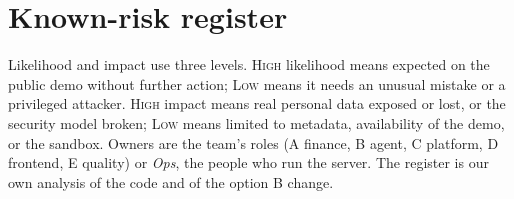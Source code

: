 \documentclass[11pt,a4paper]{article}
\newcommand{\lvl}[1]{\textsc{#1}}
\begin{document}
\section{Known-risk register}\label{sec:register}

Likelihood and impact use three levels. \lvl{High} likelihood means expected on the public demo without further action;
\lvl{Low} means it needs an unusual mistake or a privileged attacker. \lvl{High} impact means real personal data exposed
or lost, or the security model broken; \lvl{Low} means limited to metadata, availability of the demo, or the sandbox.
Owners are the team's roles (A finance, B agent, C platform, D frontend, E quality) or \emph{Ops}, the people who run the
server. The register is our own analysis of the code and of the option B change.
\end{document}
